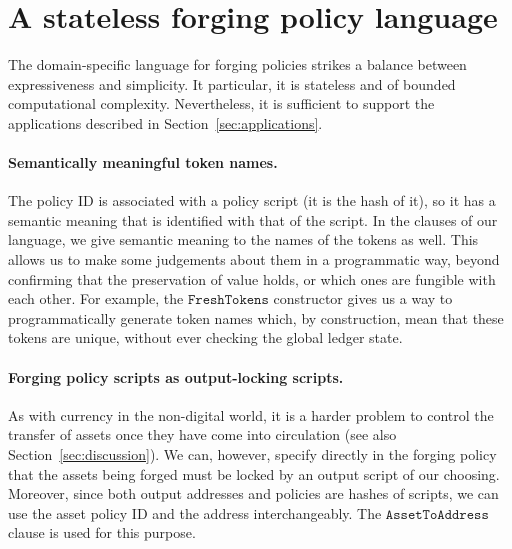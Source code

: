 \section{A stateless forging policy language}
\label{sec:fps-language}

The domain-specific language for forging policies strikes a balance between expressiveness and simplicity. It particular, it is stateless and of bounded computational complexity. Nevertheless, it is sufficient to support the applications described in Section~\ref{sec:applications}.

\paragraph{Semantically meaningful token names.}

The policy ID is associated with a policy script (it is the hash of it),
so it has a semantic meaning that is identified with that of the script.
In the clauses of our language, we give semantic meaning
to the names of the tokens as well. This allows us to make some
judgements about them in a programmatic way, beyond confirming that the
preservation of value holds, or
which ones are fungible with each other.
For example, the $\texttt{FreshTokens}$ constructor gives us a way to programmatically generate
token names which, by construction, mean that these tokens are unique, without
ever checking the global ledger state.

\paragraph{Forging policy scripts as output-locking scripts.}

As with
currency in the non-digital world, it is a harder problem to control the transfer of assets once
they have come into circulation (see also Section~\ref{sec:discussion}). We can, however,
specify directly in the forging policy that the assets being forged must
be locked by an output script of our choosing.
Moreover, since both output addresses and policies are hashes of scripts,
we can use the asset policy ID and the address interchangeably.
The $\texttt{AssetToAddress}$ clause is used for this purpose.


